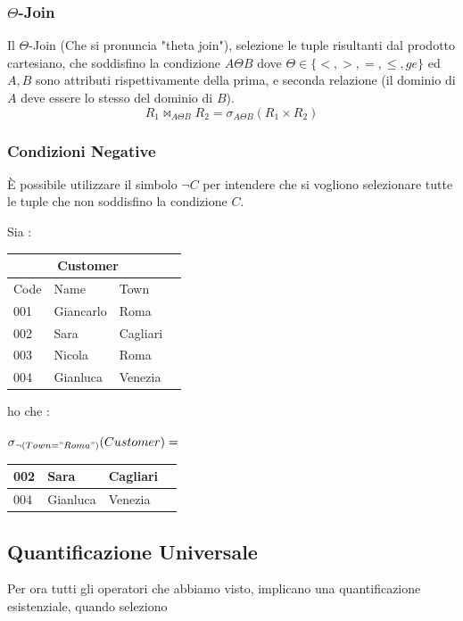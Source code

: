 \documentclass[12pt, letterpaper]{article}
\begin{document}
\subsubsection{\(\Theta\)-Join}
Il \(\Theta\)-Join (Che si pronuncia "theta join"), selezione le tuple risultanti dal prodotto cartesiano,
che soddisfino la condizione \(A\Theta B\) dove \(\Theta\in\{<,>,=,\le,ge\}\) ed \(A,B\) sono 
attributi rispettivamente della prima, e seconda relazione (il dominio di \(A\) deve essere lo stesso
del dominio di \(B\)).\begin{equation}
    R_1\Join_{A\Theta B}R_2 = \sigma_{A\Theta B}(R_1\times R_2)
\end{equation}
\subsubsection{Condizioni Negative}
È possibile utilizzare il simbolo \(\lnot C\) per intendere che si vogliono selezionare tutte le 
tuple che non soddisfino la condizione \(C\).
\begin{center} Sia : 
    \begin{tabular}{|l|l|l|r|}
        \hline
    \multicolumn{3}{|c|}{\textbf{Customer}}\\
        \hline
        Code & Name & Town \\
        \hline
        001 & Giancarlo & Roma \\
        \hline
        002 & Sara & Cagliari \\
        \hline
        003 & Nicola & Roma \\
        \hline
        004 & Gianluca & Venezia \\
        \hline
        \end{tabular}
        ho che : \end{center}\begin{center} \(\sigma_{\lnot(Town="Roma")}(Customer)=\)
        \begin{tabular}{ |l|l|l|r| } 
            \hline 002 & Sara & Cagliari \\ 
            \hline 004 & Gianluca & Venezia \\
        \hline
           \end{tabular}
\end{center}
\newpage\subsection{Quantificazione Universale}
Per ora tutti gli operatori che abbiamo visto, implicano una quantificazione esistenziale, quando seleziono 
\end{document}
